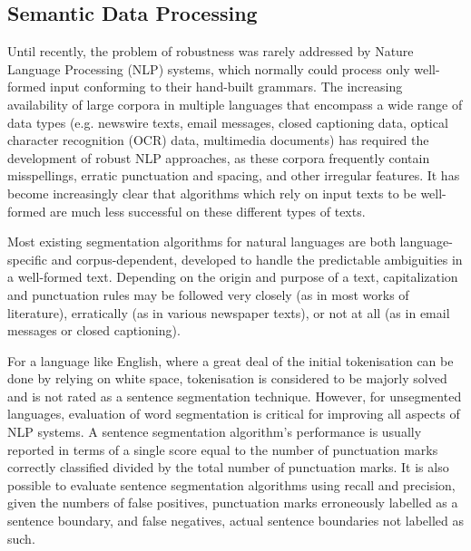 \documentclass[runningheads]{llncs}
\begin{document}
\subsection{Semantic Data Processing}

Until recently, the problem of robustness was rarely addressed by Nature Language Processing (NLP) systems, which normally could process only well-formed input conforming to their hand-built grammars. The increasing availability of large corpora in multiple languages that encompass a wide range of data types (e.g. newswire texts, email messages, closed captioning data, optical character recognition (OCR) data, multimedia documents) has required the development of robust NLP approaches, as these corpora frequently contain misspellings, erratic punctuation and spacing, and other irregular features. It has become increasingly clear that algorithms which rely on input texts to be well-formed are much less successful on these different types of texts.

Most existing segmentation algorithms for natural languages are both language-specific and corpus-dependent, developed to handle the predictable ambiguities in a well-formed text. 
Depending on the origin and purpose of a text, capitalization and punctuation rules may be followed very closely (as in most works of literature), erratically (as in various newspaper texts), or not at all (as in email messages or closed captioning).

For a language like English, where a great deal of the initial tokenisation can be done by relying on white space, tokenisation is considered to be majorly solved and is not rated as a sentence segmentation technique. However, for unsegmented languages, evaluation of word segmentation is critical for improving all aspects of NLP systems. A sentence segmentation algorithm’s performance is usually reported in terms of a single score equal to the number of punctuation marks correctly classified divided by the total number of punctuation marks. It is also possible to evaluate sentence segmentation algorithms using recall and precision, given the numbers of false positives, punctuation marks erroneously labelled as a sentence boundary, and false negatives, actual sentence boundaries not labelled as such.
\end{document}
